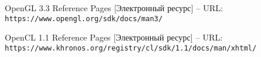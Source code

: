 \item OpenGL 3.3 Reference Pages [Электронный ресурс] -- \lb
URL: \verb|https://www.opengl.org/sdk/docs/man3/|

\item OpenCL 1.1 Reference Pages [Электронный ресурс] -- \lb
URL: \verb|https://www.khronos.org/registry/cl/sdk/1.1/docs/man/xhtml/|
